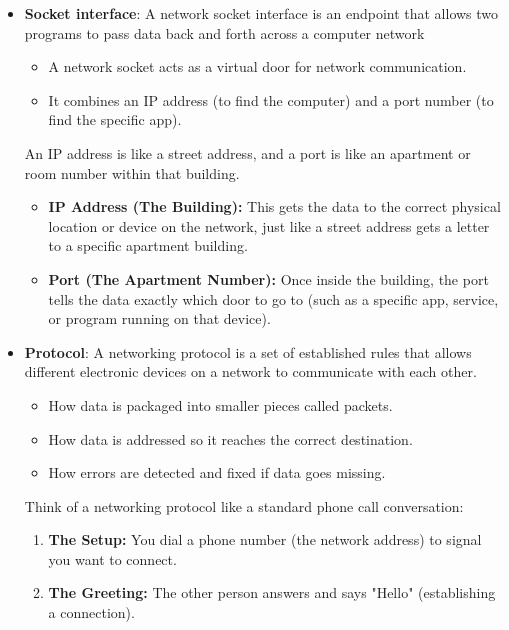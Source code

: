\documentclass{report}
\begin{document}
\begin{itemize}
\begin{itemize}
            \end{itemize}
        \item \textbf{Socket interface}: A network socket interface is an endpoint that allows two programs to pass data back and forth across a computer network
            \begin{itemize}
                \item A network socket acts as a virtual door for network communication.
                \item It combines an IP address (to find the computer) and a port number (to find the specific app).
            \end{itemize}
            An IP address is like a street address, and a port is like an apartment or room number within that building.
            \begin{itemize}
                \item \textbf{IP Address (The Building):} This gets the data to the correct physical location or device on the network, just like a street address gets a letter to a specific apartment building.
                \item \textbf{Port (The Apartment Number):} Once inside the building, the port tells the data exactly which door to go to (such as a specific app, service, or program running on that device).
            \end{itemize}
        \item \textbf{Protocol}: A networking protocol is a set of established rules that allows different electronic devices on a network to communicate with each other.
            \begin{itemize}
                \item How data is packaged into smaller pieces called packets.
                \item How data is addressed so it reaches the correct destination.
                \item How errors are detected and fixed if data goes missing.
            \end{itemize}
            Think of a networking protocol like a standard phone call conversation:
            \begin{enumerate}
                \item \textbf{The Setup:} You dial a phone number (the network address) to signal you want to connect.
                \item \textbf{The Greeting:} The other person answers and says "Hello" (establishing a connection).

\end{enumerate}
\end{itemize}
\end{document}
